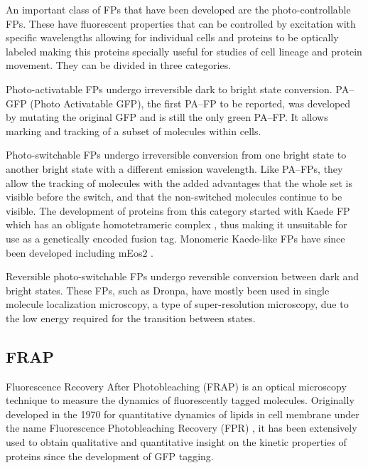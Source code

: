     An important class of FPs that have been developed are the
    photo-controllable FPs.
    These have
    fluorescent properties that can be controlled by excitation with specific
    wavelengths allowing for individual cells and proteins to be optically
    labeled making this proteins specially useful for studies of cell
    lineage and protein movement.
    They can be divided in three categories.


    Photo-activatable FPs undergo
        irreversible dark to bright state conversion.
        PA--GFP (Photo Activatable GFP), the first PA--FP to be
        reported, was developed by mutating the original GFP
        \citep{pagfp-discovery} and is
        still the only green PA--FP.
        It allows marking and tracking of a subset of molecules
        within cells.

    Photo-switchable FPs undergo
        irreversible conversion from one bright state to another bright
        state with a different emission wavelength.
        Like PA--FPs, they allow the tracking of
        molecules with the added advantages that the whole set is visible
        before the switch, and that the non-switched molecules continue
        to be visible.
        The development of proteins from this category started with Kaede FP
        which has an obligate homotetrameric
        complex \citep{kaede-discovery}, thus making it
        unsuitable for use as a genetically encoded fusion tag.
        Monomeric Kaede-like FPs have since been developed including
        mEos2 \citep{meos2-discovery}.

    Reversible photo-switchable FPs undergo
        reversible conversion between dark and bright states.
        These FPs, such as Dronpa, have mostly been used in
        single molecule localization
        microscopy, a type of super-resolution microscopy, due to the
        low energy required for the transition between states.

  \subsection{FRAP}

    Fluorescence Recovery After Photobleaching (FRAP) is an optical
    microscopy technique to measure the dynamics of fluorescently
    tagged molecules.
    Originally developed in the 1970 for quantitative dynamics of lipids
    in cell membrane under the name Fluorescence Photobleaching
    Recovery (FPR) \citep{axelrod1976mobility}, it has
    been extensively used to obtain qualitative and quantitative
    insight on the kinetic properties of proteins since the development
    of GFP tagging.

